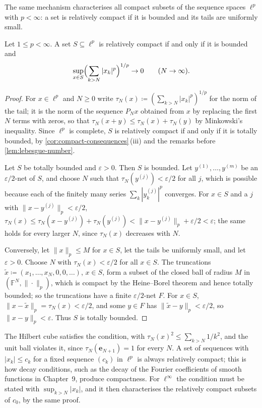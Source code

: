 The same mechanism characterises all compact subsets of the sequence spaces $\ell^p$ with $p<\infty$: a set is relatively compact if it is bounded and its tails are uniformly small.

\begin{proposition}
\label{prop:lp-compact}
Let $1\le p<\infty$. A set $S\subseteq\ell^p$ is relatively compact if and only if it is bounded and
\[
\sup_{x\in S}\Bigl(\sum_{k>N}|x_k|^p\Bigr)^{1/p}\to0\qquad(N\to\infty).
\]
\end{proposition}

\begin{proof}
For $x\in\ell^p$ and $N\ge0$ write $\tau_N(x)\coloneqq(\sum_{k>N}|x_k|^p)^{1/p}$ for the norm of the tail; it is the norm of the sequence $P_Nx$ obtained from $x$ by replacing the first $N$ terms with zeros, so that $\tau_N(x+y)\le\tau_N(x)+\tau_N(y)$ by Minkowski's inequality. Since $\ell^p$ is complete, $S$ is relatively compact if and only if it is totally bounded, by \cref{cor:compact-consequences}\,(iii) and the remarks before \cref{lem:lebesgue-number}.

Let $S$ be totally bounded and $\varepsilon>0$. Then $S$ is bounded. Let $y^{(1)},\ldots,y^{(m)}$ be an $\varepsilon/2$-net of $S$, and choose $N$ such that $\tau_N(y^{(j)})<\varepsilon/2$ for all $j$, which is possible because each of the finitely many series $\sum_k|y^{(j)}_k|^p$ converges. For $x\in S$ and a $j$ with $\|x-y^{(j)}\|_p<\varepsilon/2$, $\tau_N(x)\le\tau_N(x-y^{(j)})+\tau_N(y^{(j)})<\|x-y^{(j)}\|_p+\varepsilon/2<\varepsilon$; the same holds for every larger $N$, since $\tau_N(x)$ decreases with $N$.

Conversely, let $\|x\|_p\le M$ for $x\in S$, let the tails be uniformly small, and let $\varepsilon>0$. Choose $N$ with $\tau_N(x)<\varepsilon/2$ for all $x\in S$. The truncations $\tilde x\coloneqq(x_1,\ldots,x_N,0,0,\ldots)$, $x\in S$, form a subset of the closed ball of radius $M$ in $(\mathbb F^N,\|\cdot\|_p)$, which is compact by the Heine--Borel theorem and hence totally bounded; so the truncations have a finite $\varepsilon/2$-net $F$. For $x\in S$, $\|x-\tilde x\|_p=\tau_N(x)<\varepsilon/2$, and some $y\in F$ has $\|\tilde x-y\|_p<\varepsilon/2$, so $\|x-y\|_p<\varepsilon$. Thus $S$ is totally bounded.
\end{proof}

The Hilbert cube satisfies the condition, with $\tau_N(x)^2\le\sum_{k>N}1/k^2$, and the unit ball violates it, since $\tau_N(\mathbf e_{N+1})=1$ for every $N$. A set of sequences with $|x_k|\le c_k$ for a fixed sequence $(c_k)$ in $\ell^p$ is always relatively compact; this is how decay conditions, such as the decay of the Fourier coefficients of smooth functions in Chapter~9, produce compactness. For $\ell^\infty$ the condition must be stated with $\sup_{k>N}|x_k|$, and it then characterises the relatively compact subsets of $c_0$, by the same proof.

